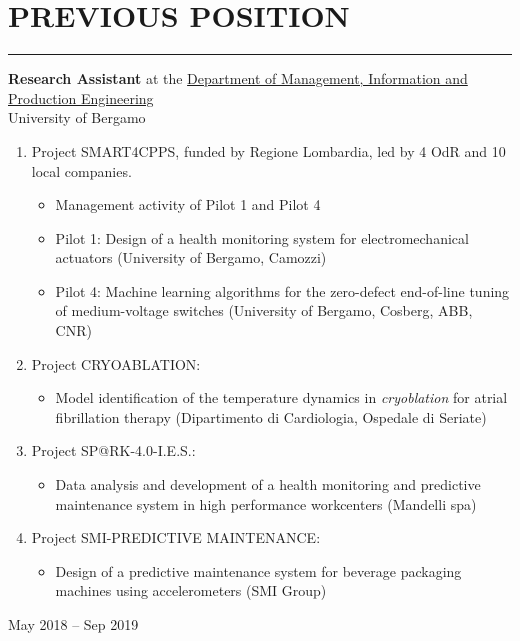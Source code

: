 \documentclass[10pt]{article}
\newcommand{\cvsection}[1]{\section*{\centering\normalsize\uppercase{#1}}\vspace{-16pt}\rule{\linewidth}{0.2pt}\vspace{6pt}}
\begin{document}
\cvsection{previous position}

\noindent
\begin{minipage}[t]{.8\textwidth}
	\raggedright
	\textbf{Research Assistant} at the \href{https://digip.unibg.it/}{Department of Management, Information and Production Engineering}\\
	University of Bergamo
	\vspace{6pt}
	\begin{enumerate}
		\renewcommand\labelitemii{$\vcenter{\hbox{\tiny$\bullet$}}$}
		\item Project SMART4CPPS, funded by Regione Lombardia, led by 4 OdR and 10 local companies.
		\begin{itemize}
			\item Management activity of Pilot 1 and Pilot 4
			\item Pilot 1: Design of a health monitoring system for electromechanical actuators (University of Bergamo, Camozzi)
			\item Pilot 4: Machine learning algorithms for the zero-defect end-of-line tuning of medium-voltage switches (University of Bergamo, Cosberg, ABB, CNR)
		\end{itemize}
		\item Project CRYOABLATION:
		\begin{itemize}
			\item Model identification of the temperature dynamics in \textit{cryoblation} for atrial fibrillation therapy (Dipartimento di Cardiologia, Ospedale di Seriate)
		\end{itemize}
		\item Project SP@RK-4.0-I.E.S.:
		\begin{itemize}
			\item Data analysis and development of a health monitoring and predictive maintenance system in high performance workcenters (Mandelli spa)
		\end{itemize}
		\item Project SMI-PREDICTIVE MAINTENANCE:
		\begin{itemize}
			\item Design of a predictive maintenance system for beverage packaging machines using accelerometers (SMI Group)
		\end{itemize}
  \end{enumerate}
\end{minipage}%
\hfill\vrule\hfill
\begin{minipage}[t]{.16\textwidth}
	\raggedleft
	May 2018 – Sep 2019
\end{minipage}
\end{document}
